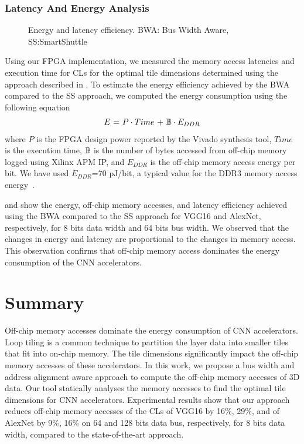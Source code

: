 \subsubsection{Latency And Energy Analysis}
\begin{figure}[htb]
	\centering
	\hfil
	\hfil
	\caption{Energy and latency efficiency. BWA: Bus Width Aware, SS:SmartShuttle}
	\label{fig:EffectOnLatency}
	\vspace{-1.0em}
\end{figure}
Using our FPGA implementation, we measured the memory access latencies and execution time for CLs for the optimal tile dimensions determined using the approach described in . To estimate the energy efficiency achieved by the BWA compared to the SS approach, we computed the energy consumption using the following equation~\cite{tu2017deep}
\begin{align}\label{eq:energyEfficiency}
	E~{=}~P\cdot Time~{+}~\mathbb{B}\cdot E_{DDR}
\end{align}
where $P$ is the FPGA design power reported by the Vivado synthesis tool, $Time$ is the execution time, $\mathbb{B}$ is the number of bytes accessed from off-chip memory logged using Xilinx APM IP, and $E_{DDR}$ is the off-chip memory access energy per bit. We have used $E_{DDR}$=70 pJ/bit, a typical value for the DDR3 memory access energy~\cite{6237004}.

 and  show the energy, off-chip memory accesses, and latency efficiency achieved using the BWA compared to the SS approach for VGG16 and AlexNet, respectively, for 8 bits data width and 64 bits bus width. We observed that the changes in energy and latency are proportional to the changes in memory access. This observation confirms that off-chip memory access dominates the energy consumption of the CNN accelerators. 
\section{Summary}
Off-chip memory accesses dominate the energy consumption of CNN accelerators. Loop tiling is a common technique to partition the layer data into smaller tiles that fit into on-chip memory. The tile dimensions significantly impact the off-chip memory accesses of these accelerators. In this work, we propose a bus width and address alignment aware approach to compute the off-chip memory accesses of 3D data. Our tool statically analyses the memory accesses to find the optimal tile dimensions for CNN accelerators. Experimental results show that our approach reduces off-chip memory accesses of the CLs of VGG16 by 16\%, 29\%, and of AlexNet by 9\%, 16\% on 64 and 128 bits data bus, respectively, for 8 bits data width, compared to the state-of-the-art approach.